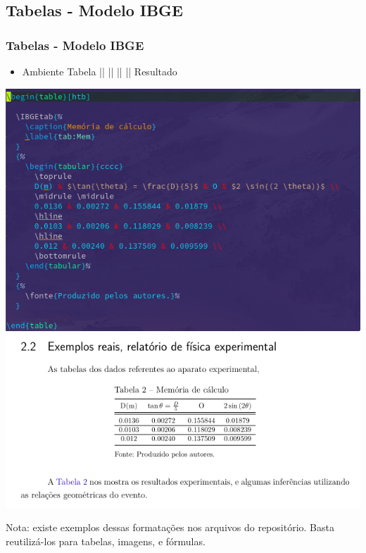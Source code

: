 \documentclass{beamer}
\begin{document}
	\begin{frame}
	  \section{Tabelas - Modelo IBGE}
	  \frametitle{Tabelas - Modelo IBGE}

	   \begin{itemize}
	  \item Ambiente Tabela || || ||  || Resultado
	  \end{itemize}

	 \begin{center}
	   \includegraphics[scale=0.28]{../Imagens/A2I61.png}
	   \includegraphics[scale=0.24]{../Imagens/A2I62.png}
	\end{center}

	\pause

	Nota: existe exemplos dessas formatações nos arquivos do
	repositório. Basta reutilizá-los para tabelas, imagens, e fórmulas.

	\end{frame}
\end{document}
